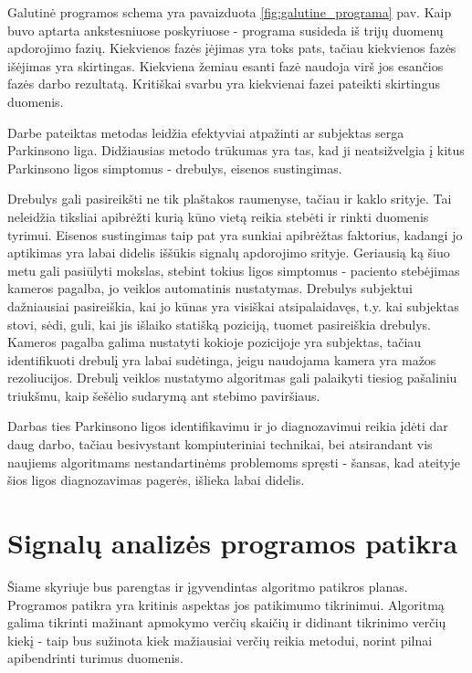 \documentclass[]{vgtuef}
\begin{document}
Galutinė programos schema yra pavaizduota \ref{fig:galutine_programa}
pav. Kaip buvo aptarta ankstesniuose poskyriuose - programa susideda
iš trijų duomenų apdorojimo fazių. Kiekvienos fazės įėjimas yra toks
pats, tačiau kiekvienos fazės išėjimas yra skirtingas. Kiekviena
žemiau esanti fazė naudoja virš jos esančios fazės darbo
rezultatą. Kritiškai svarbu yra kiekvienai fazei pateikti skirtingus
duomenis.

Darbe pateiktas metodas leidžia efektyviai atpažinti ar subjektas
serga Parkinsono liga. Didžiausias metodo trūkumas yra tas, kad ji
neatsižvelgia į kitus Parkinsono ligos simptomus - drebulys, eisenos
sustingimas.

Drebulys gali pasireikšti ne tik plaštakos raumenyse, tačiau ir kaklo
srityje. Tai neleidžia tiksliai apibrėžti kurią kūno vietą reikia
stebėti ir rinkti duomenis tyrimui. Eisenos sustingimas taip pat yra
sunkiai apibrėžtas faktorius, kadangi jo aptikimas yra labai didelis
iššūkis signalų apdorojimo srityje. Geriausią ką šiuo metu gali
pasiūlyti mokslas, stebint tokius ligos simptomus - paciento
stebėjimas kameros pagalba, jo veiklos automatinis
nustatymas. Drebulys subjektui dažniausiai pasireiškia, kai jo kūnas
yra visiškai atsipalaidavęs, t.y. kai subjektas stovi, sėdi, guli, kai
jis išlaiko statišką poziciją, tuomet pasireiškia drebulys. Kameros
pagalba galima nustatyti kokioje pozicijoje yra subjektas, tačiau
identifikuoti drebulį yra labai sudėtinga, jeigu naudojama kamera yra
mažos rezoliucijos. Drebulį veiklos nustatymo algoritmas gali
palaikyti tiesiog pašaliniu triukšmu, kaip šešėlio sudarymą ant
stebimo paviršiaus. 

Darbas ties Parkinsono ligos identifikavimu ir jo diagnozavimui reikia
įdėti dar daug darbo, tačiau besivystant kompiuteriniai technikai, bei
atsirandant vis naujiems algoritmams nestandartinėms problemoms
spręsti - šansas, kad ateityje šios ligos diagnozavimas pagerės,
išlieka labai didelis.

\section{Signalų analizės programos patikra}

Šiame skyriuje bus parengtas ir įgyvendintas algoritmo patikros
planas. Programos patikra yra kritinis aspektas jos patikimumo
tikrinimui. Algoritmą galima tikrinti mažinant apmokymo verčių skaičių
ir didinant tikrinimo verčių kiekį - taip bus sužinota kiek mažiausiai
verčių reikia metodui, norint pilnai apibendrinti turimus
duomenis.
\end{document}
